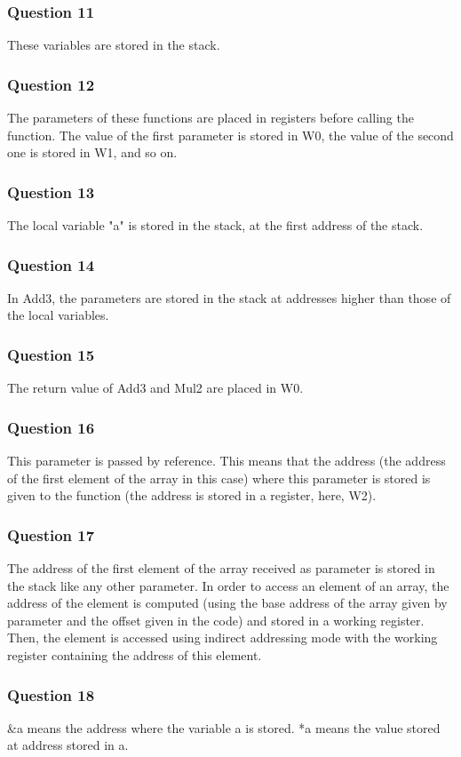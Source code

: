 \documentclass[a4paper,10pt]{article}
\begin{document}
\subsubsection*{Question 11}
These variables are stored in the stack.

\subsubsection*{Question 12}
The parameters of these functions are placed in registers before calling the function. The value of the first parameter is stored in W0, the value of the second one is stored in W1, and so on.

\subsubsection*{Question 13}
The local variable "a" is stored in the stack, at the first address of the stack.

\subsubsection*{Question 14}
In Add3, the parameters are stored in the stack at addresses higher than those of the local variables.

\subsubsection*{Question 15}
The return value of Add3 and Mul2 are placed in W0.

\subsubsection*{Question 16}
This parameter is passed by reference. This means that the address (the address of the first element of the array in this case) where this parameter is stored is given to the function (the address is stored in a register, here, W2).

\subsubsection*{Question 17}
The address of the first element of the array received as parameter is stored in the stack like any other parameter. In order to access an element of an array, the address of the element is computed (using the base address of the array given by parameter and the offset given in the code) and stored in a working register. Then, the element is accessed using indirect addressing mode with the working register containing the address of this element.

\subsubsection*{Question 18}
\&a means the address where the variable a is stored. *a means the value stored at address stored in a.
\end{document}
